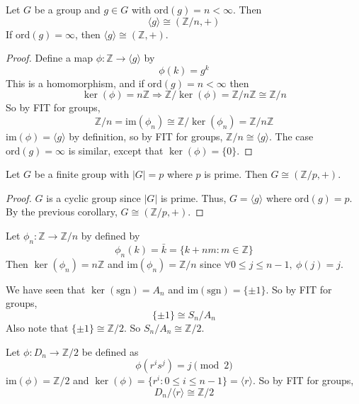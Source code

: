 \begin{corollary}
	Let $G$ be a group and $g \in G$ with $\text{ord}(g) = n < \infty$. Then
	\[
		\langle g \rangle \cong (\mathbb{Z} / n, +)
	\]
	If $\text{ord}(g) = \infty$, then $\langle g \rangle \cong (\mathbb{Z}, +)$.
\end{corollary}

\begin{proof}
	Define a map $\phi: \mathbb{Z} \rightarrow \langle g \rangle$ by
	\[
		\phi(k) = g^k
	\]
	This is a homomorphism, and if $\text{ord}(g) = n < \infty$ then
	\[
		\ker(\phi) = n \mathbb{Z} \Longrightarrow \mathbb{Z} / \ker(\phi) = \mathbb{Z} / n \mathbb{Z} \cong \mathbb{Z} / n
	\]
	So by FIT for groups,
	\[
		\mathbb{Z} / n = \text{im}(\phi_n) \cong \mathbb{Z} / \ker(\phi_n) = \mathbb{Z} / n \mathbb{Z}
	\]
	$\text{im}(\phi) = \langle g \rangle$ by definition, so by FIT for groups, $\mathbb{Z} / n \cong \langle g \rangle$. The case $\text{ord}(g) = \infty$ is similar, except that $\ker(\phi) = \{ 0 \}$.
\end{proof}

\begin{corollary}
	Let $G$ be a finite group with $|G| = p$ where $p$ is prime. Then $G \cong (\mathbb{Z} / p, +)$.
\end{corollary}

\begin{proof}
	$G$ is a cyclic group since $|G|$ is prime. Thus, $G = \langle g \rangle$ where $\text{ord}(g) = p$. By the previous corollary, $G \cong (\mathbb{Z} / p, +)$.
\end{proof}

\begin{example}
	Let $\phi_n: \mathbb{Z} \rightarrow \mathbb{Z} / n$ by defined by
	\[
		\phi_n(k) = \bar{k} = \{ k + nm: m \in \mathbb{Z} \}
	\]
	Then $\ker(\phi_n) = n \mathbb{Z}$ and $\text{im}(\phi_n) = \mathbb{Z} / n$ since $\forall 0 \le j \le n - 1, \ \phi(j) = j$.
\end{example}

\begin{example}
	We have seen that $\ker(\text{sgn}) = A_n$ and $\text{im}(\text{sgn}) = \{ \pm 1 \}$. So by FIT for groups,
	\[
		\{ \pm 1 \} \cong S_n / A_n
	\]
	Also note that $\{ \pm 1 \} \cong \mathbb{Z} / 2$. So $S_n / A_n \cong \mathbb{Z} / 2$.
\end{example}

\begin{example}
	Let $\phi: D_n \rightarrow \mathbb{Z} / 2$ be defined as
	\[
		\phi(r^i s^j) = j \pmod{2}
	\]
	$\text{im}(\phi) = \mathbb{Z} / 2$ and $\ker(\phi) = \{ r^i: 0 \le i \le n - 1\} = \langle r \rangle$. So by FIT for groups,
	\[
		D_n / \langle r \rangle \cong \mathbb{Z} / 2
	\]
\end{example}

